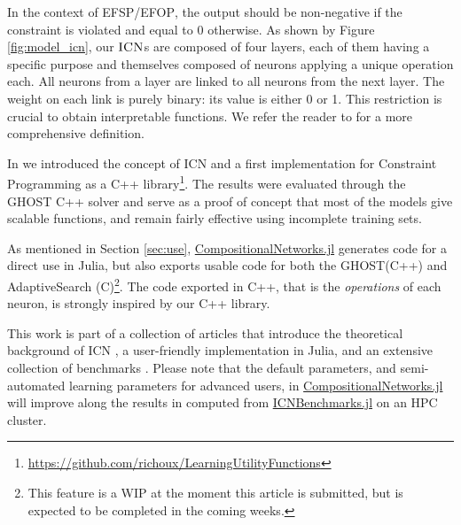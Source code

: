 \documentclass{juliacon}
\newcommand{\efsp}{\textsc{EFSP}\xspace}
\newcommand{\efop}{\textsc{EFOP}\xspace}
\newcommand{\icn}{\textsc{ICN}\xspace}
\newcommand{\cnjl}{\href{https://github.com/JuliaConstraints/CompositionalNetworks.jl}{CompositionalNetworks.jl}\xspace}
\newcommand{\icnbjl}{\href{https://github.com/JuliaConstraints/ICNBenchmarks.jl}{ICNBenchmarks.jl}\xspace}
\begin{document}
In the context of \efsp/\efop, the output should be non-negative if the constraint is violated and equal to 0 otherwise. As shown by Figure \ref{fig:model_icn}, our \(\icn\)s are
composed of four layers, each of them having a specific purpose and
themselves composed of neurons applying  a unique operation each.  All
neurons  from  a  layer  are  linked to  all  neurons  from  the  next
layer. The weight on each link is purely binary: its value is either 0
or 1. This restriction is  crucial to obtain interpretable functions. We refer the reader to \cite{richoux2020automatic} for a more comprehensive definition.


In \cite{richoux2020automatic} we introduced the concept of ICN and a first implementation for Constraint Programming as a C++ library\footnote{\url{https://github.com/richoux/LearningUtilityFunctions}}. The results were evaluated through the GHOST C++ solver \cite{richoux2016ghost} and serve as a proof of concept that most of the models give scalable functions, and remain fairly effective using incomplete training sets.

As mentioned in Section \ref{sec:use}, \cnjl generates code for a direct use in Julia, but also exports usable code for both the GHOST(C++) and AdaptiveSearch (C)\footnote{This feature is a WIP at the moment this article is submitted, but is expected to be completed in the coming weeks.}. The code exported in C++, that is the \emph{operations} of each neuron, is strongly inspired by our C++ library.

This work is part of a collection of articles that introduce the theoretical background of ICN \cite{richoux2020automatic}, a user-friendly implementation in Julia, and an extensive collection of benchmarks \cite{baffier2022interpretable}.
Please note that the default parameters, and semi-automated learning parameters for advanced users, in \cnjl will improve along the results in \cite{baffier2022interpretable} computed from \icnbjl on an HPC cluster.
\end{document}
